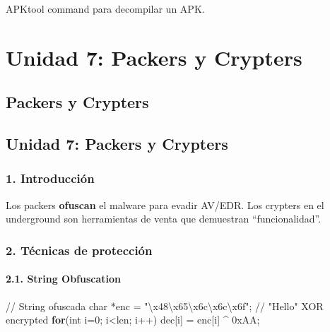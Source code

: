 \documentclass[
  letterpaper,
]{report}
\newenvironment{Shaded}{\begin{snugshade}}{\end{snugshade}}
\newcommand{\BaseNTok}[1]{\textcolor[rgb]{0.68,0.00,0.00}{#1}}
\newcommand{\CommentTok}[1]{\textcolor[rgb]{0.37,0.37,0.37}{#1}}
\newcommand{\ControlFlowTok}[1]{\textcolor[rgb]{0.00,0.23,0.31}{\textbf{#1}}}
\newcommand{\DataTypeTok}[1]{\textcolor[rgb]{0.68,0.00,0.00}{#1}}
\newcommand{\DecValTok}[1]{\textcolor[rgb]{0.68,0.00,0.00}{#1}}
\newcommand{\NormalTok}[1]{\textcolor[rgb]{0.00,0.23,0.31}{#1}}
\newcommand{\OperatorTok}[1]{\textcolor[rgb]{0.37,0.37,0.37}{#1}}
\newcommand{\SpecialCharTok}[1]{\textcolor[rgb]{0.37,0.37,0.37}{#1}}
\newcommand{\StringTok}[1]{\textcolor[rgb]{0.13,0.47,0.30}{#1}}
\begin{document}
APKtool command para decompilar un APK.

\part{Unidad 7: Packers y Crypters}

\chapter{Packers y Crypters}\label{packers-y-crypters}

\chapter{Unidad 7: Packers y
Crypters}\label{unidad-7-packers-y-crypters-1}

\section{1. Introducción}\label{introducciuxf3n-6}

Los packers \textbf{ofuscan} el malware para evadir AV/EDR. Los crypters
en el underground son herramientas de venta que demuestran
``funcionalidad''.

\section{2. Técnicas de protección}\label{tuxe9cnicas-de-protecciuxf3n}

\subsection{2.1. String Obfuscation}\label{string-obfuscation}

\begin{Shaded}
\begin{Highlighting}[]
\CommentTok{// String ofuscada}
\DataTypeTok{char} \OperatorTok{*}\NormalTok{enc }\OperatorTok{=} \StringTok{"}\SpecialCharTok{\textbackslash{}x48\textbackslash{}x65\textbackslash{}x6c\textbackslash{}x6c\textbackslash{}x6f}\StringTok{"}\OperatorTok{;} \CommentTok{// "Hello" XOR encrypted}
\ControlFlowTok{for}\OperatorTok{(}\DataTypeTok{int}\NormalTok{ i}\OperatorTok{=}\DecValTok{0}\OperatorTok{;}\NormalTok{ i}\OperatorTok{\textless{}}\NormalTok{len}\OperatorTok{;}\NormalTok{ i}\OperatorTok{++)}\NormalTok{ dec}\OperatorTok{[}\NormalTok{i}\OperatorTok{]} \OperatorTok{=}\NormalTok{ enc}\OperatorTok{[}\NormalTok{i}\OperatorTok{]} \OperatorTok{\^{}} \BaseNTok{0xAA}\OperatorTok{;}
\end{Highlighting}
\end{Shaded}
\end{document}
